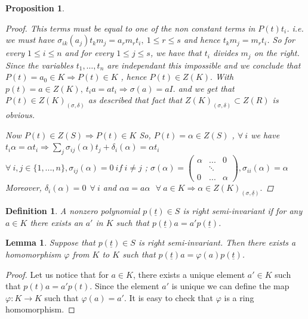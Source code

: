 \documentclass[12pt,a4paper]{article}
\newtheorem{definition}[theorem]{Definition}
\newtheorem{lemma}[theorem]{Lemma}
\newtheorem{proposition}[theorem]{Proposition}
\newcommand{\ut}{\underline{t}}
\newcommand{\ud}{\underline{\delta}}
\begin{document}
\begin{proposition}
\begin{proof}
This terms must be equal to one of the non constant terms in $P(t) t_i $. i.e. we must have $\sigma_{ik}(a_j) t_km_j = a_r m_r t_i , ~ 1 \leq r \leq s$ and hence $ t_km_j = m_r t_i $. 
So for every $1\le i \le n$ and for every $1\le j \le s$, we have that $t_i$ divides $m_j$ on the right.  Since the variables $t_1, \dots, t_n$ are independant this impossible and we conclude that $ P(t) = a_0 \in K \Rightarrow P(t) \in K$ , hence $P(t) \in Z(K).$ With $p(t) = a \in Z(K), ~ t_i a = a t_i \Rightarrow \sigma(a) = a I.$ and we get that $P(t) \in Z(K)_{(\sigma, \delta)}$ as described that fact that $Z(K)_{(\sigma, \delta)} \subset Z(R)$ is obvious.   

 
			Now  $ P(t) \in Z(S) \Longrightarrow P(t) \in K $
			So, $ P(t) = \alpha \in Z(S)$ 
			, $ \forall ~i$ we have $ t_{i} \alpha = \alpha t_{i} \Longrightarrow \sum_j \sigma_{ij} (\alpha) t_{j} + \delta_i (\alpha) = \alpha t_i$ 
			\\ $ \forall ~i, j \in \{1, ..., n\}, \sigma_{ij} (\alpha) = 0 ~ if ~ i \neq j $
			; $ \sigma (\alpha) = \left( \begin{array}{ccc}
				\alpha	& ...  &0 \\
				&\ddots& \\
				0	& ... & \alpha
			\end{array}\right) , \sigma_{ii}(\alpha) = \alpha $
			\textit{Moreover}, $ \delta_i (\alpha) = 0 ~~ \forall~ i$ and $\alpha a = a \alpha ~~~ \forall~ a \in K \Longrightarrow \alpha \in Z(K)_{(\sigma, \ud)} .$
		\end{proof}
	\end{proposition}
	
	\begin{definition}
		A nonzero polynomial $p(\ut)\in S$ is right semi-invariant if for any $a\in K$ there exists an $a'$ in $K$ such that $p(\ut)a=a'p(\ut)$.
	\end{definition}
	
	\begin{lemma}
		\label{semi-invariant poly and its map}
		Suppose that $p(\ut)\in S$ is right semi-invariant.  Then there exists a homomorphism $ \varphi $ from $K$ to $K$ such that $p(\ut)a=\varphi(a)p(\ut)$.
	\end{lemma}
	\begin{proof}
		Let us notice that for $a\in K$, there exists a unique element $a'\in K$ such that  $p(t)a=a'p(t)$.  Since the element $a'$ is unique we can define the map $\varphi:K\rightarrow K$ such that $\varphi(a)=a'$.  It is easy to check that $\varphi$ is a ring homomorphism.  
	\end{proof}
	
\end{document}
